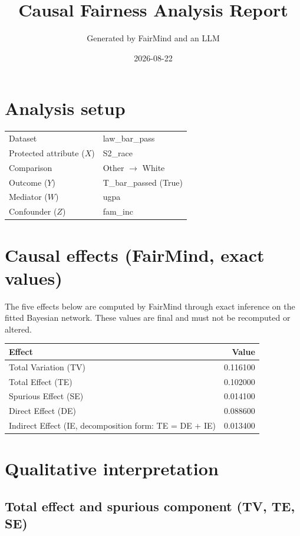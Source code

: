 \documentclass[11pt]{article}
\title{Causal Fairness Analysis Report}
\author{Generated by FairMind and an LLM}
\date{2026-08-22}
\begin{document}
\maketitle

\section{Analysis setup}

\begin{tabular}{ll}
\toprule
Dataset & law\_bar\_pass \\
Protected attribute ($X$) & S2\_race \\
Comparison & Other $\to$ White \\
Outcome ($Y$) & T\_bar\_passed (True) \\
Mediator ($W$) & ugpa \\
Confounder ($Z$) & fam\_inc \\
\bottomrule
\end{tabular}

\section{Causal effects (FairMind, exact values)}

The five effects below are computed by FairMind through exact inference on the
fitted Bayesian network. These values are final and must not be recomputed or
altered.

\begin{tabular}{lr}
\toprule
Effect & Value \\
\midrule
Total Variation (TV) & 0.116100 \\
Total Effect (TE) & 0.102000 \\
Spurious Effect (SE) & 0.014100 \\
Direct Effect (DE) & 0.088600 \\
Indirect Effect (IE, decomposition form: TE = DE + IE) & 0.013400 \\
\bottomrule
\end{tabular}

\section{Qualitative interpretation}

\subsection{Total effect and spurious component (TV, TE, SE)}
\end{document}
